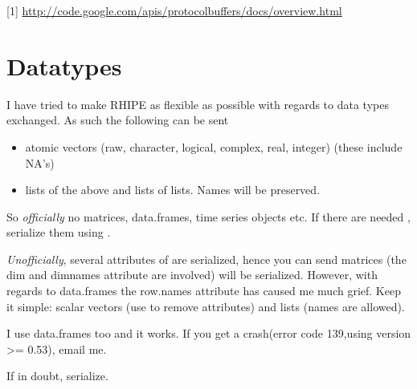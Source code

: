 \documentclass[letterpaper,10pt,english]{manual}
\begin{document}
{[}1{]} \href{http://code.google.com/apis/protocolbuffers/docs/overview.html}{http://code.google.com/apis/protocolbuffers/docs/overview.html}

\resetcurrentobjects
\hypertarget{--doc-datatypes}{}

\chapter{Datatypes}

I have tried to make RHIPE as flexible as possible with regards to data types exchanged. As such the following can be sent
\begin{itemize}
\item {} 
atomic vectors (raw, character, logical, complex, real, integer) (these include NA's)

\item {} 
lists of the above and lists of lists. Names will be preserved.

\end{itemize}

So \emph{officially} no matrices, data.frames, time series objects etc. If there are needed , serialize them using  .

\emph{Unofficially}, several attributes of are serialized, hence you can send matrices (the dim and  dimnames attribute are involved) will be serialized.
However, with regards to data.frames the row.names attribute has caused me much grief. Keep it simple: scalar vectors (use  to remove attributes) and lists (names are allowed).

I use data.frames too and it works. If you get a crash(error code 139,using version \textgreater{}= 0.53), email me.

If in doubt, serialize.


\renewcommand{\indexname}{Module Index}
\printmodindex
\renewcommand{\indexname}{Index}
\printindex
\end{document}
